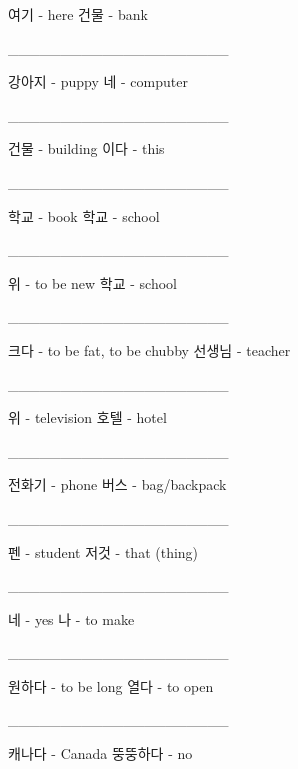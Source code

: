 \documentclass[addpoints, 30pt]{../exam}%
\begin{document}
\begin{questions}
\begin{choices}
\CorrectChoice%
여기 {-} here%
\choice%
건물 {-} bank%
\end{choices}%
\question[1]%
\_\_\_\_\_\_\_\_\_\_\_\_\_\_\_\_\_\_\_\_\_%
\begin{choices}%
\CorrectChoice%
강아지 {-} puppy%
\choice%
네 {-} computer%
\end{choices}%
\question[1]%
\_\_\_\_\_\_\_\_\_\_\_\_\_\_\_\_\_\_\_\_\_%
\begin{choices}%
\CorrectChoice%
건물 {-} building%
\choice%
이다 {-} this%
\end{choices}%
\question[1]%
\_\_\_\_\_\_\_\_\_\_\_\_\_\_\_\_\_\_\_\_\_%
\begin{choices}%
\choice%
학교 {-} book%
\CorrectChoice%
학교 {-} school%
\end{choices}%
\question[1]%
\_\_\_\_\_\_\_\_\_\_\_\_\_\_\_\_\_\_\_\_\_%
\begin{choices}%
\choice%
위 {-} to be new%
\CorrectChoice%
학교 {-} school%
\end{choices}%
\question[1]%
\_\_\_\_\_\_\_\_\_\_\_\_\_\_\_\_\_\_\_\_\_%
\begin{choices}%
\choice%
크다 {-} to be fat, to be chubby%
\CorrectChoice%
선생님 {-} teacher%
\end{choices}%
\question[1]%
\_\_\_\_\_\_\_\_\_\_\_\_\_\_\_\_\_\_\_\_\_%
\begin{choices}%
\choice%
위 {-} television%
\CorrectChoice%
호텔 {-} hotel%
\end{choices}%
\question[1]%
\_\_\_\_\_\_\_\_\_\_\_\_\_\_\_\_\_\_\_\_\_%
\begin{choices}%
\CorrectChoice%
전화기 {-} phone%
\choice%
버스 {-} bag/backpack%
\end{choices}%
\question[1]%
\_\_\_\_\_\_\_\_\_\_\_\_\_\_\_\_\_\_\_\_\_%
\begin{choices}%
\choice%
펜 {-} student%
\CorrectChoice%
저것 {-} that (thing)%
\end{choices}%
\question[1]%
\_\_\_\_\_\_\_\_\_\_\_\_\_\_\_\_\_\_\_\_\_%
\begin{choices}%
\CorrectChoice%
네 {-} yes%
\choice%
나 {-} to make%
\end{choices}%
\question[1]%
\_\_\_\_\_\_\_\_\_\_\_\_\_\_\_\_\_\_\_\_\_%
\begin{choices}%
\choice%
원하다 {-} to be long%
\CorrectChoice%
열다 {-} to open%
\end{choices}%
\question[1]%
\_\_\_\_\_\_\_\_\_\_\_\_\_\_\_\_\_\_\_\_\_%
\begin{choices}%
\CorrectChoice%
캐나다 {-} Canada%
\choice%
뚱뚱하다 {-} no%

\end{choices}
\end{questions}
\end{document}
